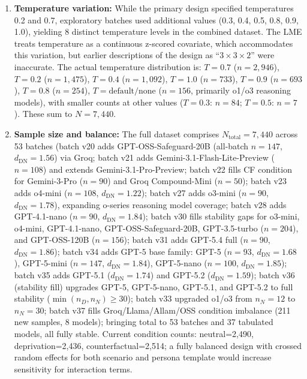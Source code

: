 \documentclass[11pt]{article}
\begin{document}
\begin{enumerate}
  \item \textbf{Temperature variation:} While the primary design specified temperatures 0.2 and 0.7, exploratory batches used additional values (0.3, 0.4, 0.5, 0.8, 0.9, 1.0), yielding 8 distinct temperature levels in the combined dataset. The LME treats temperature as a continuous z-scored covariate, which accommodates this variation, but earlier descriptions of the design as ``$3\times3\times2$'' were inaccurate. The actual temperature distribution is: $T=0.7$ ($n=2{,}946$), $T=0.2$ ($n=1{,}475$), $T=0.4$ ($n=1{,}092$), $T=1.0$ ($n=733$), $T=0.9$ ($n=693$), $T=0.8$ ($n=254$), $T=\text{default/none}$ ($n=156$, primarily o1/o3 reasoning models), with smaller counts at other values ($T=0.3$: $n=84$; $T=0.5$: $n=7$). These sum to $N=7{,}440$.
  \item \textbf{Sample size and balance:} The full dataset comprises $N_\text{total}=7{,}440$ across 53 batches (batch v20 adds GPT-OSS-Safeguard-20B (all-batch $n=147$, $d_\text{DN}=1.56$) via Groq; batch v21 adds Gemini-3.1-Flash-Lite-Preview ($n=108$) and extends Gemini-3.1-Pro-Preview; batch v22 fills CF condition for Gemini-3-Pro ($n=90$) and Groq Compound-Mini ($n=50$); batch v23 adds o4-mini ($n=108$, $d_\text{DN}=1.22$); batch v27 adds o3-mini ($n=90$, $d_\text{DN}=1.78$), expanding o-series reasoning model coverage; batch v28 adds GPT-4.1-nano ($n=90$, $d_\text{DN}=1.84$); batch v30 fills stability gaps for o3-mini, o4-mini, GPT-4.1-nano, GPT-OSS-Safeguard-20B, GPT-3.5-turbo ($n=204$), and GPT-OSS-120B ($n=156$); batch v31 adds GPT-5.4 full ($n=90$, $d_\text{DN}=1.86$); batch v34 adds GPT-5 base family: GPT-5 ($n=93$, $d_\text{DN}=1.68$), GPT-5-mini ($n=147$, $d_\text{DN}=1.84$), GPT-5-nano ($n=100$, $d_\text{DN}=1.85$); batch v35 adds GPT-5.1 ($d_\text{DN}=1.74$) and GPT-5.2 ($d_\text{DN}=1.59$); batch v36 (stability fill) upgrades GPT-5, GPT-5-nano, GPT-5.1, and GPT-5.2 to full stability ($\min(n_D,n_N)\geq30$); batch v33 upgraded o1/o3 from $n_N=12$ to $n_N=30$; batch v37 fills Groq/Llama/Allam/OSS condition imbalance (211 new samples, 8 models); bringing total to 53 batches and 37 tabulated models, all fully stable. Current condition counts: neutral=2,490, deprivation=2,436, counterfactual=2,514; a fully balanced design with crossed random effects for both scenario and persona template would increase sensitivity for interaction terms.

\end{enumerate}
\end{document}
